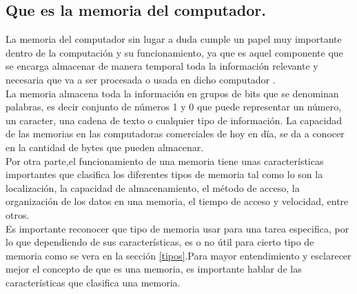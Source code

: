\documentclass{article}
\begin{document}
\subsection{Que es la memoria del computador.} \label{contenido}
La memoria del computador sin lugar a duda cumple un papel muy importante dentro de la computación y su funcionamiento, ya que es aquel componente que se encarga almacenar de manera temporal toda la información relevante y necesaria que va a ser procesada o usada en dicho computador \cite{augusto}.\\

La memoria almacena toda la información en grupos de bits que se denominan palabras, es decir conjunto de números 1 y 0 que puede representar un número, un caracter, una cadena de texto o cualquier tipo de información. La capacidad de las memorias en las computadoras comerciales de hoy en día, se da a conocer en la cantidad de bytes que pueden almacenar.\cite{arquitectura}\\

Por otra parte,el funcionamiento de una memoria tiene unas características importantes que clasifica los
diferentes tipos de memoria tal como lo son la localización, la capacidad de almacenamiento, el método de acceso, la organización de los datos en una memoria, el tiempo de acceso y velocidad, entre otros.\\

Es importante reconocer que tipo de memoria usar para una tarea especifica, por lo que dependiendo de sus características, es o no útil para cierto tipo de memoria como se vera en la sección \ref{tipos}.Para mayor entendimiento y esclarecer mejor el concepto de que es una memoria, es importante hablar de las características que clasifica una memoria.
\end{document}
